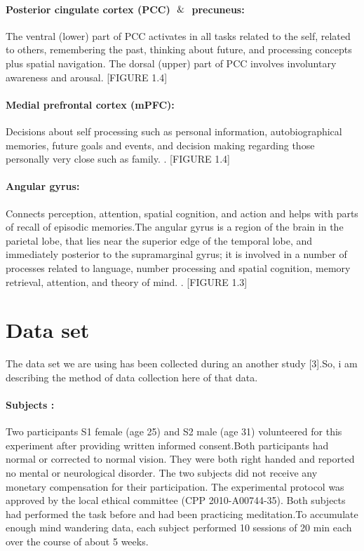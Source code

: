 \paragraph{Posterior cingulate cortex (PCC) $\And$ precuneus: } The ventral (lower) part of PCC activates in all tasks related to the self, related to others, remembering the past, thinking about future, and processing concepts plus spatial navigation. The dorsal (upper) part of PCC involves involuntary awareness and arousal. [FIGURE 1.4]

\paragraph{Medial prefrontal cortex (mPFC):} Decisions about self processing such as personal information, autobiographical memories, future goals and events, and decision making regarding those personally very close such as family. . [FIGURE 1.4]

\paragraph{Angular gyrus:} Connects perception, attention, spatial cognition, and action and helps with parts of recall of episodic memories.The angular gyrus is a region of the brain in the parietal lobe, that lies near the superior edge of the temporal lobe, and immediately posterior to the supramarginal gyrus; it is involved in a number of processes related to language, number processing and spatial cognition, memory retrieval, attention, and theory of mind. . [FIGURE 1.3]


\section{Data set}
The data set we are using has been collected during an another study [3].So, i am describing the method of data collection here of that data.
\paragraph{Subjects :}
   Two participants S1 female (age 25) and S2 male (age 31) volunteered for this experiment after providing written informed consent.Both participants had normal or corrected to normal vision. They were both right handed and reported no mental or neurological disorder. The two subjects did not receive any monetary compensation for their participation. The experimental protocol was approved by the local ethical committee (CPP 2010-A00744-35). Both subjects had performed the task before and had been practicing meditation.To accumulate enough mind wandering data, each subject performed 10 sessions of 20 min each over the course of about 5 weeks.
